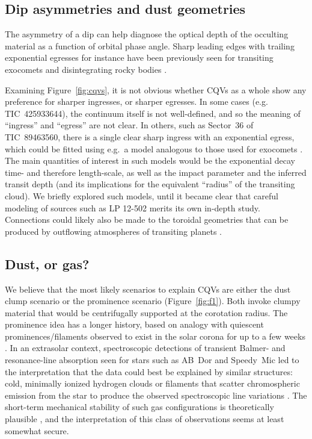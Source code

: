 \documentclass[11pt,twocolumn,tighten]{aastex63}
\begin{document}
\subsection{Dip asymmetries and dust geometries}

The asymmetry of a dip can help diagnose the optical depth of the
occulting material as a function of orbital phase angle.  Sharp
leading edges with trailing exponential egresses for instance have
been previously seen for transiting exocomets and disintegrating rocky
bodies
\citep[e.g.][]{2012ApJ...752....1R,2012A&A...545L...5B,2015Natur.526..546V,2019A&A...625L..13Z}.

Examining Figure~\ref{fig:cqvs}, it is not obvious whether CQVs as a
whole show any preference for sharper ingresses, or sharper egresses.
In some cases (e.g. TIC~425933644), the continuum itself is not
well-defined, and so the meaning of ``ingress'' and ``egress'' are not
clear.  In others, such as Sector~36 of TIC~89463560, there is a
single clear sharp ingress with an exponential egress, which could be
fitted using e.g.~a model analogous to those used for exocomets
\citep[e.g.][]{2019A&A...625L..13Z}.  The main quantities of interest
in such models would be the exponential decay time- and therefore
length-scale, as well as the impact parameter and the inferred transit
depth (and its implications for the equivalent ``radius'' of the
transiting cloud).  We briefly explored such models, until it
became clear that careful modeling of sources such as LP
12-502 merits its own in-depth study.  Connections could likely also
be made to the toroidal geometries that can be produced by outflowing
atmospheres of transiting planets
\citep[e.g.][]{2019ApJ...873...89M,2022ApJ...926..226M}.



\subsection{Dust, or gas?}

We believe that the most likely scenarios to explain CQVs are either
the dust clump scenario or the prominence scenario
(Figure~\ref{fig:f1}).  Both invoke clumpy material that would be
centrifugally supported at the corotation radius.  The prominence idea
has a longer history, based on analogy with quiescent
prominences/filaments observed to exist in the solar corona for up to
a few weeks \citep[see][]{2015ASSL..415.....V}.  In an extrasolar
context, spectroscopic detections of transient Balmer- and
resonance-line absorption seen for stars such as AB~Dor and Speedy~Mic
\citep[e.g.][]{1989MNRAS.238..657C,1993MNRAS.262..369J,2006MNRAS.365..530D,2016MNRAS.463..965L}
led to the interpretation that the data could best be explained by
similar structures: cold, minimally ionized hydrogen clouds or
filaments that scatter chromospheric emission from the star to produce
the observed spectroscopic line variations
\citep[see][]{1989MNRAS.238..657C}.  The short-term mechanical
stability of such gas configurations is theoretically plausible
\citep{2000MNRAS.316..647F,2022MNRAS.514.5465W}, and the
interpretation of this class of observations seems at least somewhat
secure.
\end{document}
